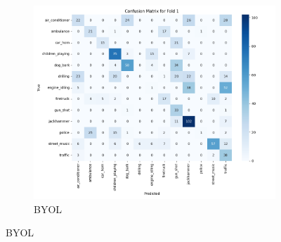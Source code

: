 \documentclass[11pt]{article}
\begin{document}
\begin{figure}[ht]
\begin{subfigure}[b]{0.24\textwidth}
        \centering
        \includegraphics[width=\textwidth]{latex/assets/1-fold-1-epoch/confusion_matrix_byol.png}
        \caption{BYOL}
        \label{fig:cm_byol}
    \end{subfigure}
    
    \vspace{0.5cm}
    

\end{figure}
\end{document}
